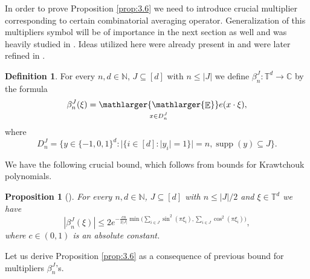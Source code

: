 \documentclass[a4paper,oneside, reqno]{amsart}
\numberwithin{equation}{section}
\newtheorem{Prop}[Thm]{Proposition}
\theoremstyle{definition}%
\theoremstyle{definition}
\newtheorem{Defn}[Thm]{Definition}
\theoremstyle{definition}%
\theoremstyle{definition}
\newcommand{\E}{\mathop{\mathbb{E}}}
\newcommand{\N}{\mathbb{N}}
\newcommand{\T}{\mathbb{T}}
\DeclareMathOperator{\supp}{supp}
\newcommand{\se}[1]{\underset{_{\substack{#1}}}{\mathlarger{\mathlarger{\E}}}}
\begin{document}
In order to prove Proposition \ref{prop:3.6} we need to introduce crucial multiplier corresponding to certain combinatorial averaging operator. Generalization of this multipliers symbol will be of importance in the next section as well and was heavily studied in \cite{NW}. Ideas utilized here were already present in \cite[Proposition 3.3]{balls} and were later refined in \cite[Section 3]{Ni2}.
\begin{Defn}
    For every $n,d \in \N$, $J\subseteq [d]$ with $n \leq |J|$ we define $\beta_n^J: \T^d \to \mathbb{C}$ by the formula
    \[
    \beta_{n}^J(\xi)=  \se{x \in D_n^J}e( x \cdot \xi),
    \]
    where
    \[
    D_n^J=\Big\{ y \in \{-1,0,1\}^d: |\{i \in [d]: |y_i|=1\}|=n, \supp(y) \subseteq J \Big\}.
    \]
\end{Defn}
We have the following crucial bound, which follows from bounds for Krawtchouk polynomials.
\begin{Prop}[{\cite[Proposition 3.4]{Ni2}}] \label{prop:3.4}
 For every $n,d \in \N$, $J\subseteq [d]$ with $n \leq |J|/2$ and $\xi \in \mathbb{T}^d$ we have
     \[ \tag{2} 
     |\beta_n^J(\xi)| \leq 2 e^{- \frac{cn}{2|J|} \min\big( \sum_{i \in J} \sin^2(\pi \xi_i), \sum_{i \in J} \cos^2(\pi \xi_i)  \big)},
     \]
     where $c \in (0,1)$ is an absolute constant.
\end{Prop}
Let us derive Proposition \ref{prop:3.6} as a consequence of previous bound for multipliers $\beta^J_n$'s.
\end{document}
